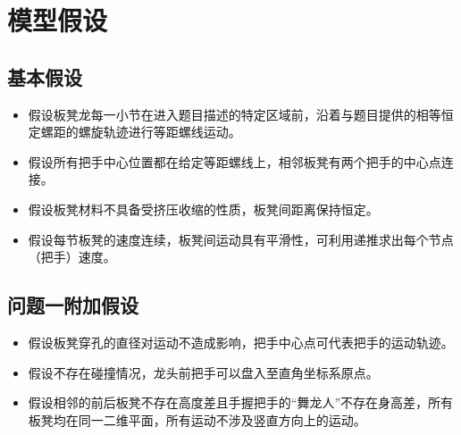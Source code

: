 \documentclass[withoutpreface,bwprint]{cumcmthesis}
\begin{document}



\section{模型假设}
\subsection{基本假设}
\begin{itemize}
	\item 假设板凳龙每一小节在进入题目描述的特定区域前，沿着与题目提供的相等恒定螺距的螺旋轨迹进行等距螺线运动。
	\item 假设所有把手中心位置都在给定等距螺线上，相邻板凳有两个把手的中心点连接。
	\item 假设板凳材料不具备受挤压收缩的性质，板凳间距离保持恒定。
	\item 假设每节板凳的速度连续，板凳间运动具有平滑性，可利用递推求出每个节点（把手）速度。
\end{itemize}
\subsection{问题一附加假设}
\begin{itemize}
	\item 假设板凳穿孔的直径对运动不造成影响，把手中心点可代表把手的运动轨迹。
  \item 假设不存在碰撞情况，龙头前把手可以盘入至直角坐标系原点。
  \item 假设相邻的前后板凳不存在高度差且手握把手的“舞龙人”不存在身高差，所有板凳均在同一二维平面，所有运动不涉及竖直方向上的运动。
\end{itemize}
\end{document}
